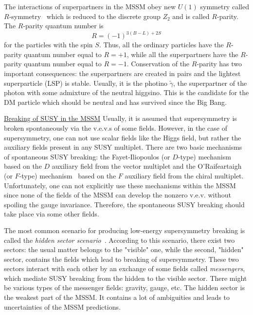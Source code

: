 \documentclass{cernyrep}
\begin{document}
\clearpage
The interactions of superpartners in the MSSM obey 
new $U(1)$ symmetry called $R$-symmetry~\cite{r-symmetry}
which is reduced to the discrete group $Z_2$ and is called
$R$-parity. The $R$-parity quantum number  is
\begin{equation}
R=(-1)^{3(B-L)+2S}
\label{par}
\end{equation}
for the particles with the spin $S$. Thus, all the ordinary
particles have the $R$-parity quantum number equal to $R=+1$,
while all the superpartners have the $R$-parity quantum number
equal to $R=-1$. 
Conservation of the $R$-parity has two important consequences:
 the superpartners are created in pairs and 
the lightest superparticle (LSP) is stable.
Usually, it is the photino $\tilde \gamma $, the superpartner
of the photon with some admixture of the neutral higgsino. This
is the candidate for the DM particle which should be neutral
and has survived since the Big Bang.

\underline{Breaking of SUSY in the MSSM}
Usually, it is assumed that supersymmetry is broken
spontaneously via the v.e.v.s of some fields.  However, in
the case of supersymmetry, one can not use scalar fields
like the Higgs field, but rather the auxiliary fields present
in any SUSY  multiplet. There are two basic mechanisms of
spontaneous SUSY breaking: the Fayet-Iliopoulos (or $D$-type)
mechanism~\cite{Fayet} based on the  $D$ auxiliary field from
the vector multiplet and the O'Raifeartaigh (or $F$-type)
mechanism~\cite{O'R} based on the $F$ auxiliary field from the
chiral multiplet. Unfortunately, one can not explicitly use
these mechanisms within the MSSM since none of the fields of
the MSSM can develop the nonzero v.e.v. without spoiling the
gauge invariance. Therefore, the spontaneous SUSY breaking
should take place via some other fields.

The most common scenario for producing low-energy supersymmetry
breaking is called the {\em hidden sector
scenario}~\cite{hidden}. According to this scenario, there exist
two sectors: the usual matter belongs to the "visible" one, while
the second, "hidden" sector, contains the fields which lead to
breaking of supersymmetry. These two sectors interact with
each other by an exchange of some fields called {\em messengers},
which mediate SUSY breaking from the hidden to the visible sector.
There might be various types of the messenger fields: gravity,
gauge, etc. The hidden sector is the weakest part of the MSSM.
It contains a lot of ambiguities and leads to uncertainties of
the MSSM predictions.
\end{document}
